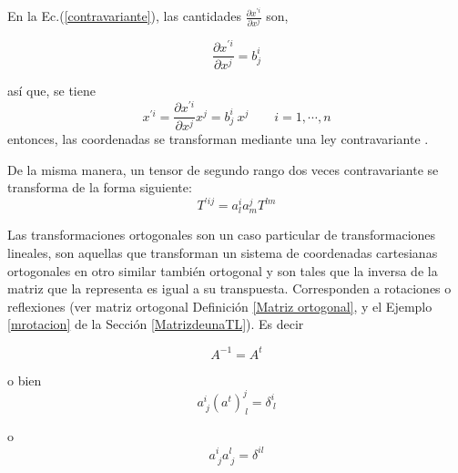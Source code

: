 En la Ec.(\ref{contravariante}),   las cantidades $\frac{\partial  x^{'i}}{\partial   x^{j}}$ son, 

\begin{equation}
\frac{\partial  x^{\prime i}}{\partial   x^{j}} = b^{i}_{j}
\end{equation}

\bigskip
así que, se tiene 
\begin{equation}
x^{\prime i} = \frac{\partial  x^{\prime i}}{\partial   x^{j}} x^{j} = b^{i}_{j}   ~  x^{j} \qquad i=1,\cdots,n 
\label{contrax}
\end{equation}
\noindent
entonces, las coordenadas se transforman mediante una ley contravariante .









De la misma manera, un tensor de segundo rango dos veces contravariante se transforma de la forma siguiente:
\begin{equation}
\label{Tpij}
T^{\prime ij} = a^{i}_{l}a^{j}_{m}T^{lm}
\end{equation}




Las transformaciones ortogonales son un caso particular de transformaciones lineales, son aquellas  que  transforman un sistema de coordenadas cartesianas ortogonales en otro similar también ortogonal y son tales que la inversa de la matriz que la representa es igual a su transpuesta. Corresponden a rotaciones o reflexiones  (ver  matriz ortogonal Definición  \ref{Matriz ortogonal}, y el Ejemplo \ref{mrotacion} de la Sección \ref{MatrizdeunaTL}).
Es decir 

$$A^{-1}= A^t$$

o bien $$  a^i_{~j} (a^t)^j_{~l}  = \delta^i_{ ~l} $$


o 
$$  a^i_{~j} a^l_{~j} = \delta^{ il} $$

